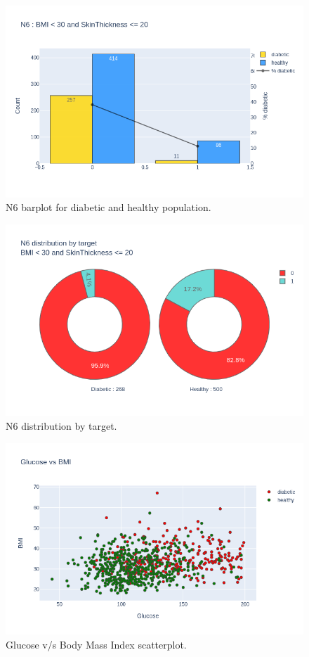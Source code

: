 \documentclass[12pt]{article}
\begin{document}
\begin{figure}[ht]
\centering
\includegraphics[width=1\textwidth]{newplot(26).png}
\caption{\label{fig:36} N6 barplot for diabetic and healthy population.}
\end{figure}

\begin{figure}[ht]
\centering
\includegraphics[width=1\textwidth]{newplot(27).png}
\caption{\label{fig:37} N6 distribution by target.}
\end{figure}

\begin{figure}[ht]
\centering
\includegraphics[width=1\textwidth]{newplot(28).png}
\caption{\label{fig:38} Glucose v/s Body Mass Index scatterplot.}
\end{figure}
\end{document}
